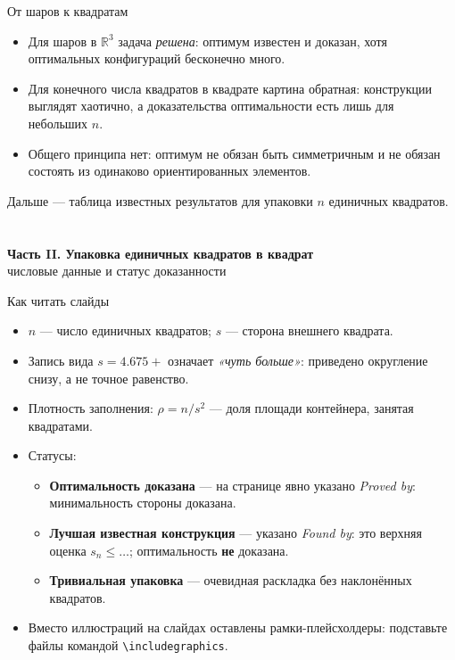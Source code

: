 \documentclass[aspectratio=169,10pt]{beamer}
\newcommand{\statusProved}{\textcolor{cProved}{\textbf{Оптимальность доказана}}}
\newcommand{\statusFound}{\textcolor{cFound}{\textbf{Лучшая известная конструкция}}}
\newcommand{\statusTrivial}{\textcolor{cTrivial}{\textbf{Тривиальная упаковка}}}
\begin{document}
\begin{frame}{От шаров к квадратам}
\small
\begin{itemize}\itemsep4pt
  \item Для шаров в $\mathbb{R}^3$ задача \emph{решена}: оптимум известен и доказан, хотя оптимальных конфигураций бесконечно много.
  \item Для конечного числа квадратов в квадрате картина обратная: конструкции выглядят хаотично, а доказательства оптимальности есть лишь для небольших $n$.
  \item Общего принципа нет: оптимум не обязан быть симметричным и не обязан состоять из одинаково ориентированных элементов.
\end{itemize}
\vspace{0.8em}
\centering
{\footnotesize Дальше — таблица известных результатов для упаковки $n$ единичных квадратов.}
\end{frame}


\section*{}
\begin{frame}[plain]
\vfill
\centering
{\Large\bfseries Часть II. Упаковка единичных квадратов в квадрат}\\[6pt]
{\color{cMuted}\small числовые данные и статус доказанности}
\vfill
\end{frame}

\begin{frame}{Как читать слайды}
\footnotesize
\begin{itemize}
  \item $n$ — число единичных квадратов; $s$ — сторона внешнего квадрата.
  \item Запись вида $s = 4.675{+}$ означает \emph{«чуть больше»}: приведено округление снизу, а не точное равенство.
  \item Плотность заполнения: $\rho = n / s^2$ — доля площади контейнера, занятая квадратами.
  \item Статусы:
  \begin{itemize}
    \item \statusProved{} — на странице явно указано \emph{Proved by}: минимальность стороны доказана.
    \item \statusFound{} — указано \emph{Found by}: это верхняя оценка $s_n \le \ldots$; оптимальность \textbf{не} доказана.
    \item \statusTrivial{} — очевидная раскладка без наклонённых квадратов.
  \end{itemize}
  \item Вместо иллюстраций на слайдах оставлены рамки-плейсхолдеры: подставьте файлы командой
        \texttt{\textbackslash includegraphics}.
\end{itemize}
\end{frame}
\end{document}
